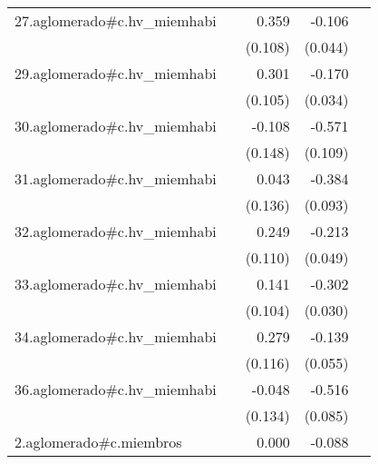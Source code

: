 {\begin{longtable}{l*{4}{D{.}{.}{-1}}}
\addlinespace
27.aglomerado#c.hv\_miemhabi&                     &       0.359\sym{***}&      -0.106\sym{*}  &                     \\
            &                     &     (0.108)         &     (0.044)         &                     \\
\addlinespace
29.aglomerado#c.hv\_miemhabi&                     &       0.301\sym{**} &      -0.170\sym{***}&                     \\
            &                     &     (0.105)         &     (0.034)         &                     \\
\addlinespace
30.aglomerado#c.hv\_miemhabi&                     &      -0.108         &      -0.571\sym{***}&                     \\
            &                     &     (0.148)         &     (0.109)         &                     \\
\addlinespace
31.aglomerado#c.hv\_miemhabi&                     &       0.043         &      -0.384\sym{***}&                     \\
            &                     &     (0.136)         &     (0.093)         &                     \\
\addlinespace
32.aglomerado#c.hv\_miemhabi&                     &       0.249\sym{*}  &      -0.213\sym{***}&                     \\
            &                     &     (0.110)         &     (0.049)         &                     \\
\addlinespace
33.aglomerado#c.hv\_miemhabi&                     &       0.141         &      -0.302\sym{***}&                     \\
            &                     &     (0.104)         &     (0.030)         &                     \\
\addlinespace
34.aglomerado#c.hv\_miemhabi&                     &       0.279\sym{*}  &      -0.139\sym{*}  &                     \\
            &                     &     (0.116)         &     (0.055)         &                     \\
\addlinespace
36.aglomerado#c.hv\_miemhabi&                     &      -0.048         &      -0.516\sym{***}&                     \\
            &                     &     (0.134)         &     (0.085)         &                     \\
\addlinespace
2.aglomerado#c.miembros&                     &       0.000         &      -0.088\sym{***}&                     \\

\end{longtable}}
